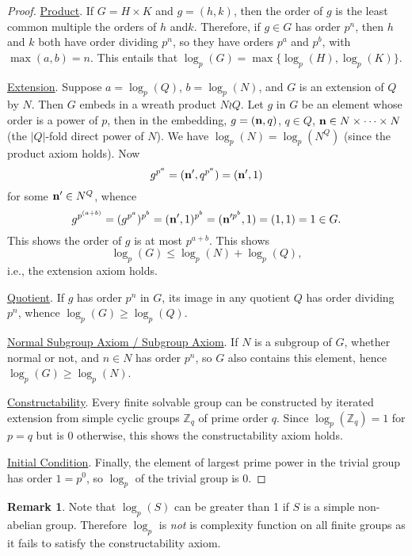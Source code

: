 \documentclass[a4paper,11pt]{amsart}
\theoremstyle{definition}
\newtheorem{remark}[theorem]{Remark}
\newcommand{\Z}{\mathbb{Z}}
\newcommand{\1}{{\mathbf 1}}
\newcommand{\n}{{\bf n}}
\begin{document}
\begin{proof}

\noindent\underline{Product}.  If $G=H\times K$ and $g=(h,k)$, then the order of $g$ is the least common multiple the orders of $h$ and$k$.
Therefore, if $g\in G$ has order $p^n$, then $h$ and $k$ both have order dividing $p^n$, so they have orders $p^a$
and $p^b$, with $\max(a,b)=n$.  This entails that $\log_p(G)=\max\{\log_p(H),\log_p(K)\}$.

\noindent\underline{Extension}.  Suppose $a=\log_p(Q)$, $b=\log_p(N)$, and $G$ is an extension of $Q$ by $N$. Then $G$ embeds in a wreath product $N\wr Q$.
Let $g$ in $G$ be an element whose order  is a power of $p$, then in the embedding,
$g=(\n,q)$, $q\in Q$, $\n \in N \times \cdots \times N$ (the $|Q|$-fold direct power of $N$).
 We have $\log_p(N)=\log_p(N^Q)$ (since the product axiom holds). 
Now $$g^{p^a}=(\n',q^{p^a})=(\n',1)$$ for some $\n'\in N^Q$, whence
$$g^{p^{(a+b)}}=(g^{p^a})^{p^b}=(\n',1)^{p^b}=(\n'^{p^b},1)=(1,1)=1 \in G.$$ 
This shows the order of $g$ is at most $p^{a+b}$. This shows $$\log_p(G)\leq \log_p(N)+\log_p(Q),$$ i.e., the extension axiom holds.


\noindent\underline{Quotient}.  If $g$ has order $p^n$ in $G$, its image in any quotient $Q$ has order dividing $p^n$, whence
$\log_p(G)\geq \log_p(Q)$.

\noindent\underline{Normal Subgroup Axiom / Subgroup Axiom}.  If $N$ is a subgroup of $G$, whether normal or not, and $n\in N$ has order $p^n$, so $G$ also contains this element, hence $\log_p(G)\geq \log_p(N)$.

\noindent\underline{Constructability}.  Every finite solvable group can be constructed by iterated extension from simple cyclic groups $\Z_q$ of  prime order $q$.
Since $\log_p(\Z_q)=1$ for $p=q$ but is $0$ otherwise, this shows the constructability axiom holds.



\noindent\underline{Initial Condition}. Finally, the element of largest prime power in the trivial group has order $1=p^0$, so $\log_p$ of the trivial group is $0$.
\end{proof}

\begin{remark}
Note that $\log_p(S)$ can be greater than 1 if $S$ is a simple non-abelian group. Therefore $\log_p$ is {\em not} is complexity function on all finite groups as it fails to satisfy the constructability axiom.
\end{remark}   
\end{document}
